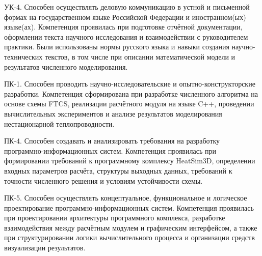 УК-4. Способен осуществлять деловую коммуникацию в устной и 
письменной формах на государственном языке Российской Федерации 
и иностранном(ых) языке(ах). Компетенция проявилась при подготовке 
отчётной документации, оформлении текста научного исследования 
и взаимодействии с руководителем практики. Были использованы нормы 
русского языка и навыки создания научно-технических текстов, в том 
числе при описании математической модели и результатов численного 
моделирования.

ПК-1. Способен проводить научно-исследовательские и 
опытно-конструкторские разработки. Компетенция сформирована при 
разработке численного алгоритма на основе схемы FTCS, реализации 
расчётного модуля на языке C++, проведении вычислительных 
экспериментов и анализе результатов моделирования нестационарной 
теплопроводности.

ПК-4. Способен создавать и анализировать требования на разработку 
программно-информационных систем. Компетенция проявилась при 
формировании требований к программному комплексу HeatSim3D, 
определении входных параметров расчёта, структуры выходных данных, 
требований к точности численного решения и условиям устойчивости 
схемы.

ПК-5. Способен осуществлять концептуальное, функциональное и 
логическое проектирование программно-информационных систем. 
Компетенция проявилась при проектировании архитектуры программного 
комплекса, разработке взаимодействия между расчётным модулем и 
графическим интерфейсом, а также при структурировании логики 
вычислительного процесса и организации средств визуализации 
результатов.